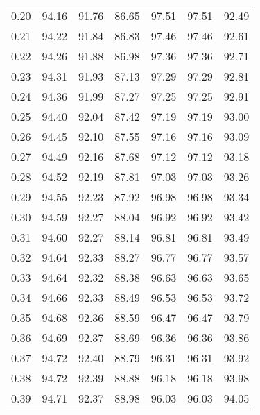 \begin{tabular}{|c|c|c|c|c|c|c|}
      0.20 &     94.16 &     91.76 &      86.65 &   97.51 &      97.51 &         92.49 \\
      0.21 &     94.22 &     91.84 &      86.83 &   97.46 &      97.46 &         92.61 \\
      0.22 &     94.26 &     91.88 &      86.98 &   97.36 &      97.36 &         92.71 \\
      0.23 &     94.31 &     91.93 &      87.13 &   97.29 &      97.29 &         92.81 \\
      0.24 &     94.36 &     91.99 &      87.27 &   97.25 &      97.25 &         92.91 \\
      0.25 &     94.40 &     92.04 &      87.42 &   97.19 &      97.19 &         93.00 \\
      0.26 &     94.45 &     92.10 &      87.55 &   97.16 &      97.16 &         93.09 \\
      0.27 &     94.49 &     92.16 &      87.68 &   97.12 &      97.12 &         93.18 \\
      0.28 &     94.52 &     92.19 &      87.81 &   97.03 &      97.03 &         93.26 \\
      0.29 &     94.55 &     92.23 &      87.92 &   96.98 &      96.98 &         93.34 \\
      0.30 &     94.59 &     92.27 &      88.04 &   96.92 &      96.92 &         93.42 \\
      0.31 &     94.60 &     92.27 &      88.14 &   96.81 &      96.81 &         93.49 \\
      0.32 &     94.64 &     92.33 &      88.27 &   96.77 &      96.77 &         93.57 \\
      0.33 &     94.64 &     92.32 &      88.38 &   96.63 &      96.63 &         93.65 \\
      0.34 &     94.66 &     92.33 &      88.49 &   96.53 &      96.53 &         93.72 \\
      0.35 &     94.68 &     92.36 &      88.59 &   96.47 &      96.47 &         93.79 \\
      0.36 &     94.69 &     92.37 &      88.69 &   96.36 &      96.36 &         93.86 \\
      0.37 &     94.72 &     92.40 &      88.79 &   96.31 &      96.31 &         93.92 \\
      0.38 &     94.72 &     92.39 &      88.88 &   96.18 &      96.18 &         93.98 \\
      0.39 &     94.71 &     92.37 &      88.98 &   96.03 &      96.03 &         94.05 \\

\end{tabular}

